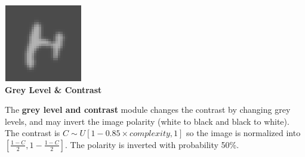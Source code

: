 \documentclass{article} %
\begin{document}
\vspace*{1mm}

\begin{minipage}[t]{0.25\linewidth}
\centering
\hspace*{-16mm}\includegraphics[scale=.4]{images/Contrast_only.png}\\
{\bf Grey Level \& Contrast}
\end{minipage}%
\hspace{-12mm}\begin{minipage}[t]{0.82\linewidth}
\vspace*{-18mm}
The {\bf grey level and contrast} module changes the contrast by changing grey levels, and may invert the image polarity (white
to black and black to white). The contrast is $C \sim U[1-0.85 \times complexity,1]$ 
so the image is normalized into $[\frac{1-C}{2},1-\frac{1-C}{2}]$. The
polarity is inverted with probability 50\%.
\end{minipage}
\vspace{2mm}

\end{document}
